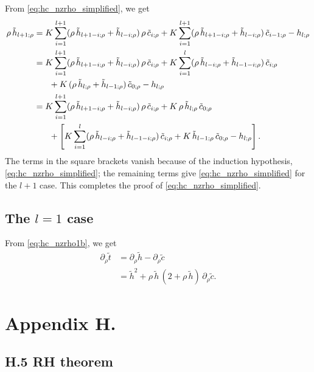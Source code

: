 \documentclass[preprint]{revtex4-1}
\numberwithin{equation}{subsection}
\numberwithin{table}{section}
\begin{document}
From \eqref{eq:hc_nzrho_simplified},
we get
\begin{align*}
  \rho \, \tilde h_{l+1;\rho}
&=
  K \sum_{i = 1}^{l+1}
  (\rho \, \tilde h_{l+1-i;\rho} + \tilde h_{l-i;\rho}) \,
  \rho \, \tilde c_{i;\rho}
+
  K \sum_{i = 1}^{l+1}
  (\rho \, \tilde h_{l+1-i;\rho} + \tilde h_{l-i;\rho}) \,
  \tilde c_{i-1;\rho}
-
  h_{l;\rho}
%
%
%
\\
&=
  K \sum_{i = 1}^{l+1}
  (\rho \, \tilde h_{l+1-i;\rho} + \tilde h_{l-i;\rho}) \,
  \rho \, \tilde c_{i;\rho}
+
  K \sum_{i = 1}^{l}
  (\rho \, \tilde h_{l-i;\rho} + \tilde h_{l-1-i;\rho}) \,
  \tilde c_{i;\rho}
\\
&\hphantom{=\quad}
+ K \,
  (\rho \, \tilde h_{l;\rho} + \tilde h_{l-1;\rho}) \,
  \tilde c_{0;\rho}
-
  h_{l;\rho}
%
%
%
\\
&=
  K \sum_{i = 1}^{l+1}
  (\rho \, \tilde h_{l+1-i;\rho} + \tilde h_{l-i;\rho}) \,
  \rho \, \tilde c_{i;\rho}
+ K \,
  \rho \, \tilde h_{l;\rho} \,
  \tilde c_{0;\rho}
\\
&\hphantom{=\quad}
+
\left[
  K \sum_{i = 1}^{l}
  (\rho \, \tilde h_{l-i;\rho} + \tilde h_{l-1-i;\rho}) \,
  \tilde c_{i;\rho}
+ K \,
  \tilde h_{l-1;\rho} \,
  \tilde c_{0;\rho}
-
  h_{l;\rho}
\right].
%
%
%
\end{align*}
The terms in the square brackets vanish because of the induction hypothesis,
\eqref{eq:hc_nzrho_simplified};
the remaining terms give
\eqref{eq:hc_nzrho_simplified}
for the $l + 1$ case.
This completes the proof of
\eqref{eq:hc_nzrho_simplified}.



\subsection{The $l = 1$ case}

From \eqref{eq:hc_nzrho1b},
we get
\begin{align*}
\partial_\rho \tilde t
&=
\partial_\rho \tilde h
-
\partial_\rho \tilde c
\\
&=
\tilde h^2
+
\rho \, \tilde h \,
(2 + \rho \, \tilde h) \,
\partial_\rho \tilde c.
\end{align*}



\section{Appendix H.}



\subsection{H.5 RH theorem}
\end{document}
